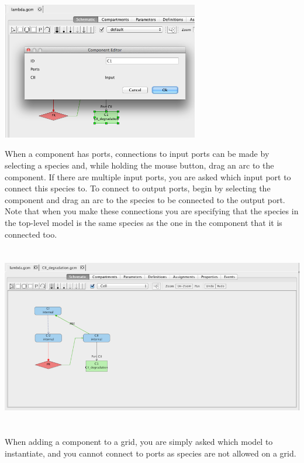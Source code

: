 \documentclass[titlepage,11pt]{article}
\begin{document}
\begin{center}
\includegraphics[height=60mm]{screenshots/editComp}
\end{center}


When a component has ports, connections to input ports can be made by selecting a species and, while holding the mouse button, drag an arc to the component.  If there are multiple input ports, you are asked which input port to connect this species to.  To connect to output ports, begin by selecting the component and drag an arc to the species to be connected to the output port.  Note that when you make these connections you are specifying that the species in the top-level model is the same species as the one in the component that it is connected too.  

\begin{center}
\includegraphics[height=80mm]{screenshots/addPort}
\end{center}

When adding a component to a grid, you are simply asked which model to instantiate, and you cannot connect to ports as species are not allowed on a grid.
\end{document}
